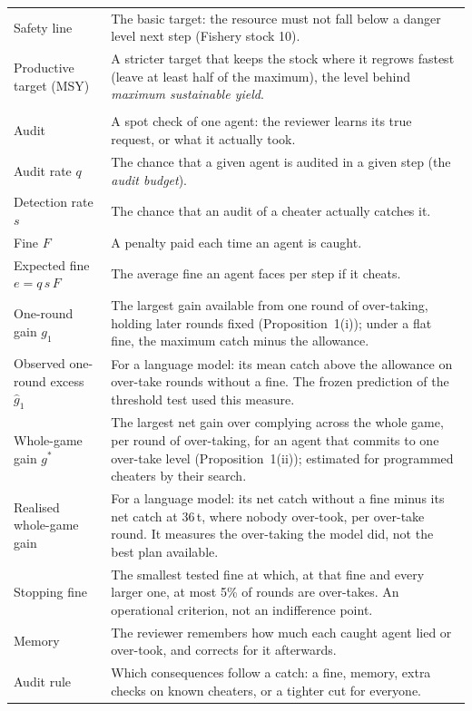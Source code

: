 \documentclass[10pt,letterpaper]{article}
\newcommand{\gone}{g_1}
\newcommand{\gstar}{g^{*}}
\begin{document}
\begin{table}[!ht]
\begin{tabular}{@{}p{}p{}@{}}
Safety line & The basic target: the resource must not fall below a danger level next step (Fishery stock 10). \\
Productive target (MSY) & A stricter target that keeps the stock where it regrows fastest (leave at least half of the maximum), the level behind \emph{maximum sustainable yield}. \\
\addlinespace
\multicolumn{2}{@{}l}{\emph{Checking and consequences}} \\
Audit & A spot check of one agent: the reviewer learns its true request, or what it actually took. \\
Audit rate $q$ & The chance that a given agent is audited in a given step (the \emph{audit budget}). \\
Detection rate $s$ & The chance that an audit of a cheater actually catches it. \\
Fine $F$ & A penalty paid each time an agent is caught. \\
Expected fine $e=q\,s\,F$ & The average fine an agent faces per step if it cheats. \\
One-round gain $\gone$ & The largest gain available from one round of over-taking, holding later rounds fixed (Proposition~1(i)); under a flat fine, the maximum catch minus the allowance. \\
Observed one-round excess $\hat g_1$ & For a language model: its mean catch above the allowance on over-take rounds without a fine. The frozen prediction of the threshold test used this measure. \\
Whole-game gain $\gstar$ & The largest net gain over complying across the whole game, per round of over-taking, for an agent that commits to one over-take level (Proposition~1(ii)); estimated for programmed cheaters by their search. \\
Realised whole-game gain & For a language model: its net catch without a fine minus its net catch at 36\,t, where nobody over-took, per over-take round. It measures the over-taking the model did, not the best plan available. \\
Stopping fine & The smallest tested fine at which, at that fine and every larger one, at most 5\% of rounds are over-takes. An operational criterion, not an indifference point. \\
Memory & The reviewer remembers how much each caught agent lied or over-took, and corrects for it afterwards. \\
Audit rule & Which consequences follow a catch: a fine, memory, extra checks on known cheaters, or a tighter cut for everyone. \\

\end{tabular}
\end{table}
\end{document}
